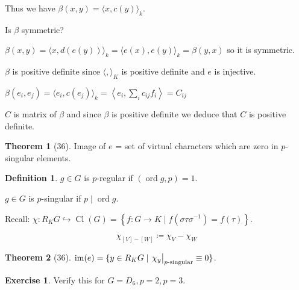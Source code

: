 \documentclass{article}
\theoremstyle{definition}
\newtheorem*{exercise}{Exercise}
\newtheorem*{definition}{Definition}
\newtheorem{theorem}{Theorem}
\begin{document}
Thus we have \(\beta (x,y) = \langle x, c(y) \rangle_k\).

Is \(\beta\) symmetric?

\(\beta(x,y) = \langle x, d(e(y)) \rangle_k = \langle e(x),e(y) \rangle _k = \beta(y,x)\) so it is symmetric.

\(\beta\) is positive definite since \(\langle , \rangle _K\) is positive definite and \(e\) is injective.

\(\beta(e_i, e_j) = \langle e_i, c(e_j) \rangle _k = \left\langle e_i, \sum_{i} c_{ij} f_i \right\rangle = C_{ij}\) 

\(C\) is matrix of \(\beta\) and since \(\beta\) is positive definite we deduce that \(C\) is positive definite.

\begin{theorem}
    [36] Image of \(e\) = set of virtual characters which are zero in \(p\)-singular elements.
\end{theorem}

\begin{definition}
    \(g\in G\) is \(p\)-regular if \((\operatorname{ord} g, p)=1\).
    
    \(g\in G\) is \(p\)-singular if \(p\mid \operatorname{ord} g\).
\end{definition}

Recall: \(\chi: R_K G \hookrightarrow \operatorname{Cl} (G) = \left\{ f: G\to K \mid f(\sigma \tau \sigma ^{-1}) = f(\tau) \right\} \).

\[
    \chi_{[V]-[W]} \coloneqq \chi_V - \chi_W
\]

\begin{theorem}
    [36]

    \(\operatorname{im} (e) = \{ y\in R_K G \mid \eval{\chi_y}_{p \text{-singular} }^{} \equiv 0 \} \).
\end{theorem}

\begin{exercise}
    Verify this for \(G=D_6, p=2, p=3\).
\end{exercise}
\end{document}

